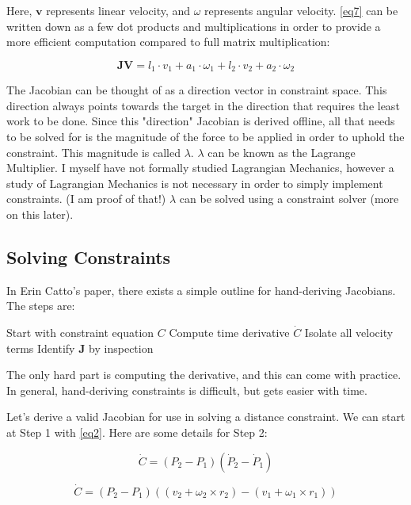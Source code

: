 Here, \(\mathbf{v}\) represents linear velocity, and \(\omega\) represents angular velocity. \eqref{eq7} can be written down as a few dot products and multiplications in order to provide a more efficient computation compared to full matrix multiplication:

\begin{equation}
\mathbf{JV} = l_1 \cdot v_1 + a_1 \cdot \omega_1 + l_2 \cdot v_2 + a_2 \cdot \omega_2
\label{eq8}
\end{equation}

The Jacobian can be thought of as a direction vector in constraint space. This direction always points towards the target in the direction that requires the least work to be done. Since this "direction" Jacobian is derived offline, all that needs to be solved for is the magnitude of the force to be applied in order to uphold the constraint. This magnitude is called \(\lambda\). \(\lambda\) can be known as the Lagrange Multiplier. I myself have not formally studied Lagrangian Mechanics, however a study of Lagrangian Mechanics is not necessary in order to simply implement constraints. (I am proof of that!) \(\lambda\) can be solved using a constraint solver (more on this later).

\subsection{Solving Constraints}
In Erin Catto's paper\cite{catto2009modeling}, there exists a simple outline for hand-deriving Jacobians. The steps are:

    Start with constraint equation \(C\)
    Compute time derivative \(\dot{C}\)
    Isolate all velocity terms
    Identify \(\mathbf{J}\) by inspection

The only hard part is computing the derivative, and this can come with practice. In general, hand-deriving constraints is difficult, but gets easier with time.

Let's derive a valid Jacobian for use in solving a distance constraint. We can start at Step 1 with \eqref{eq2}. Here are some details for Step 2:

\begin{equation}
\dot{C} = (P_2 - P_1)(\dot{P}_2 - \dot{P}_1)
\label{eq9}
\end{equation}

\begin{equation}
\dot{C} = (P_2 - P_1)((v_2 + \omega_2 \times r_2) - (v_1 + \omega_1 \times r_1))
\label{eq10}
\end{equation}

